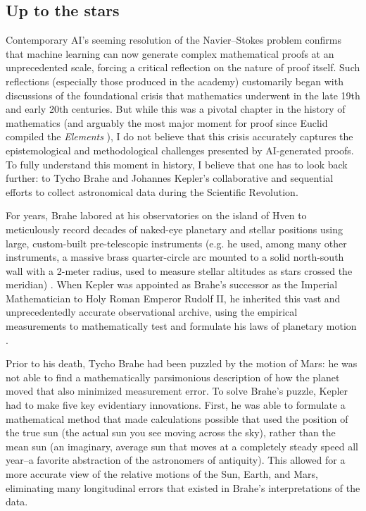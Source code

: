 \documentclass{article}
\begin{document}
\subsection{Up to the stars}

Contemporary AI's seeming resolution of the Navier--Stokes problem \textit{\parencite{openai2026navier}} confirms that machine learning can now generate complex 
mathematical proofs at an unprecedented scale, forcing a critical reflection on the nature of proof itself.
Such reflections (especially those produced in the academy) customarily began with discussions of the foundational crisis that mathematics underwent
in the late 19th and early 20th centuries. But while this was a pivotal chapter in the history of mathematics (and arguably the most 
major moment for proof since Euclid compiled the \textit{Elements} \textit{\parencite{euclid1908}}), I do not believe that this crisis accurately captures 
the epistemological and methodological challenges presented by AI-generated proofs. To fully understand this moment in history, I 
believe that one has to look back further: to Tycho Brahe and Johannes Kepler's collaborative and sequential efforts to collect 
astronomical data during the Scientific Revolution.

For years, Brahe labored at his observatories on the island of Hven to meticulously record decades of naked-eye planetary and stellar 
positions using large, custom-built pre-telescopic instruments (e.g. he used, among many other instruments, a massive brass 
quarter-circle arc mounted to a solid north-south wall with a 2-meter radius, used to measure stellar altitudes as stars 
crossed the meridian) \textit{\parencite{brahe1598,thoren1990}}. When Kepler was appointed as Brahe's successor as the Imperial Mathematician to Holy Roman Emperor 
Rudolf II, he inherited this vast and unprecedentedly accurate observational archive, using the empirical measurements to 
mathematically test and formulate his laws of planetary motion \textit{\parencite{kepler1609,kepler1992}}.

Prior to his death, Tycho Brahe had been puzzled by the motion of Mars: he was not able to find a mathematically parsimonious 
description of how the planet moved that also minimized measurement error. To solve Brahe's puzzle, Kepler had to make five 
key evidentiary innovations. First, he was able to formulate a mathematical method that made calculations
possible that used the position of the true sun (the actual sun you see moving across the sky), rather than the 
mean sun (an imaginary, average sun that moves at a completely steady speed all year--a favorite abstraction of 
the astronomers of antiquity). This allowed for a more accurate view of the relative motions of the Sun, Earth, and Mars, 
eliminating many longitudinal errors that existed in Brahe's interpretations of the data. 
\end{document}
